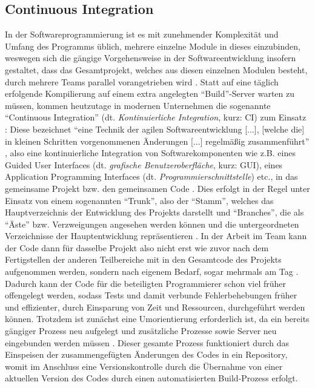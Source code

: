 \subsection{Continuous Integration}
In der Softwareprogrammierung ist es mit zunehmender Komplexität und Umfang des Programms üblich, mehrere einzelne Module in dieses einzubinden, weswegen sich die gängige Vorgehensweise in der Softwareentwicklung insofern gestaltet, dass das Gesamtprojekt,
welches aus diesen einzelnen Modulen besteht, durch mehrere Teams parallel vorangetrieben wird \cite{HJL:2018aa}. \newline Statt auf eine täglich erfolgende Kompilierung auf einem extra angelegten \enquote{Build}-Server warten zu müssen, kommen heutzutage in modernen
Unternehmen die sogenannte \enquote{Continuous Integration} (dt. \textit{Kontinuierliche Integration}, kurz: CI) zum Einsatz \cite{HJL:2018aa}: Diese bezeichnet \enquote{eine Technik der agilen Softwareentwicklung [...], [welche die] in kleinen Schritten vorgenommenen Änderungen [...] 
regelmäßig zusammenführt} \cite{Dirk:2018aa}, also eine kontinuierliche Integration von Softwarekomponenten wie z.B. eines Guided User Interfaces (dt. \textit{grafische Benutzeroberfläche}, kurz: GUI), eines Application Programming Interfaces (dt. \textit{Programmierschnittstelle}) etc.,
in das gemeinsame Projekt bzw. den gemeinsamen Code \cite{HJL:2018aa}. \newline Dies erfolgt in der Regel unter Einsatz von einem sogenannten \enquote{Trunk}, also der \enquote{Stamm}, welches das Hauptverzeichnis der Entwicklung des Projekts darstellt  und \enquote{Branches}, die als 
\enquote{Äste} bzw. Verzweigungen angesehen werden können und die untergeordneten Verzeichnisse der Hauptentwicklung repräsentieren \cite{Peters:2015aa}. \newline In der Arbeit im Team kann der Code dann für dasselbe Projekt also nicht erst wie zuvor nach dem Fertigstellen der anderen 
Teilbereiche mit in den Gesamtcode des Projekts aufgenommen werden, sondern nach eigenem Bedarf, sogar mehrmals am Tag \cite{Dirk:2018aa}. Dadurch kann der Code für die beteiligten Programmierer schon viel früher offengelegt werden, sodass Tests und damit verbunde Fehlerbehebungen früher 
und effizienter, durch Einsparung von Zeit und Ressourcen, durchgeführt werden können. \newline Trotzdem ist zunächst eine Umorientierung erforderlich ist, da ein bereits gängiger Prozess neu aufgelegt und zusätzliche Prozesse sowie Server neu eingebunden werden müssen \cite{HJL:2018aa, Dirk:2018aa}. 
Dieser gesamte Prozess funktioniert durch das Einspeisen der zusammengefügten Änderungen des Codes in ein Repository, womit im Anschluss eine Versionskontrolle durch die Übernahme von einer aktuellen Version des Codes durch einen automatisierten Build-Prozess \cite{HJL:2018aa} erfolgt.

